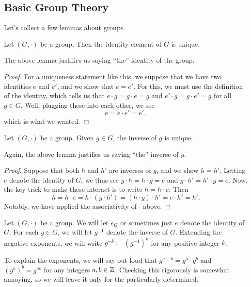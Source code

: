 \documentclass[../notes.tex]{subfiles}
\begin{document}
\subsection{Basic Group Theory}
Let's collect a few lemmas about groups.
\begin{lemma} \label{lem:id-is-uniq}
    Let $(G,\cdot)$ be a group. Then the identity element of $G$ is unique.
\end{lemma}
The above lemma justifies us saying ``the'' identity of the group.
\begin{proof}
    For a uniqueness statement like this, we suppose that we have two identities $e$ and $e'$, and we show that $e=e'$. For this, we must use the definition of the identity, which tells us that $e\cdot g=g\cdot e=g$ and $e'\cdot g=g\cdot e'=g$ for all $g\in G$. Well, plugging these into each other, we see
    \[e=e\cdot e'=e',\]
    which is what we wanted.
\end{proof}
\begin{lemma} \label{lem:inv-uniq}
    Let $(G,\cdot)$ be a group. Given $g\in G$, the inverse of $g$ is unique.
\end{lemma}
Again, the above lemma justifies us saying ``the'' inverse of $g$.
\begin{proof}
    Suppose that both $h$ and $h'$ are inverses of $g$, and we show $h=h'$. Letting $e$ denote the identity of $G$, we thus see $g\cdot h=h\cdot g=e$ and $g\cdot h'=h'\cdot g=e$. Now, the key trick to make these interact is to write $h=h\cdot e$. Then
    \[h=h\cdot e=h\cdot(g\cdot h')=(h\cdot g)\cdot h'=e\cdot h'=h'.\]
    Notably, we have applied the associativity of $\cdot$ above.
\end{proof}
\begin{notation}
    Let $(G,\cdot)$ be a group. We will let $e_G$ or sometimes just $e$ denote the identity of $G$. For each $g\in G$, we will let $g^{-1}$ denote the inverse of $G$. Extending the negative exponents, we will write $g^{-k}\coloneq\left(g^{-1}\right)^k$ for any positive integer $k$.
\end{notation}
To explain the exponents, we will say out loud that $g^{a+b}=g^a\cdot g^b$ and $\left(g^a\right)^b=g^{ab}$ for any integers $a,b\in\mathbb Z$. Checking this rigorously is somewhat annoying, so we will leave it only for the particularly determined.
\end{document}
